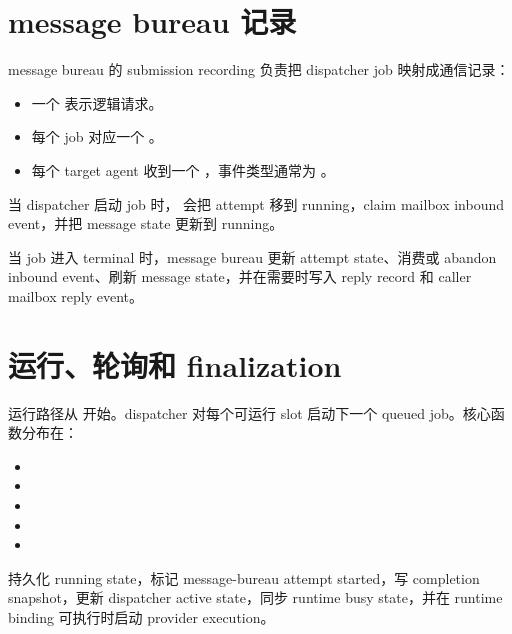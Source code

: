 \section{message bureau 记录}

message bureau 的 submission recording 负责把 dispatcher job 映射成通信记录：

\begin{itemize}
  \item 一个  表示逻辑请求。
  \item 每个 job 对应一个 。
  \item 每个 target agent 收到一个 ，事件类型通常为 。
\end{itemize}

当 dispatcher 启动 job 时， 会把 attempt 移到 running，claim mailbox inbound event，并把 message state 更新到 running。

当 job 进入 terminal 时，message bureau 更新 attempt state、消费或 abandon inbound event、刷新 message state，并在需要时写入 reply record 和 caller mailbox reply event。

\section{运行、轮询和 finalization}

运行路径从  开始。dispatcher 对每个可运行 slot 启动下一个 queued job。核心函数分布在：

\begin{itemize}
  \item {}
  \item {}
  \item {}
  \item {}
  \item {}
\end{itemize}

 持久化 running state，标记 message-bureau attempt started，写 completion snapshot，更新 dispatcher active state，同步 runtime busy state，并在 runtime binding 可执行时启动 provider execution。

